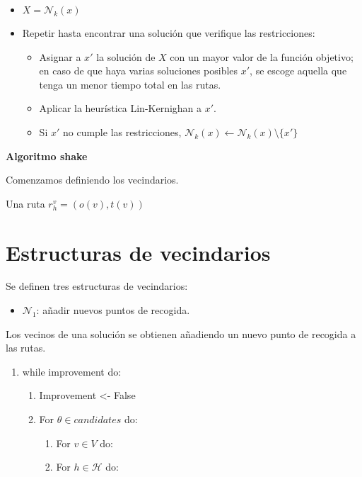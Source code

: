 \documentclass[
]{article}
\providecommand{\tightlist}{%
  \setlength{\itemsep}{0pt}\setlength{\parskip}{0pt}}
\begin{document}
\begin{itemize}
\tightlist
\item
  \(X = \mathcal{N}_k(x)\)
\item
  Repetir hasta encontrar una solución que verifique las restricciones:

  \begin{itemize}
  \tightlist
  \item
    Asignar a \(x'\) la solución de \(X\) con un mayor valor de la
    función objetivo; en caso de que haya varias soluciones posibles
    \(x'\), se escoge aquella que tenga un menor tiempo total en las
    rutas.
  \item
    Aplicar la heurística Lin-Kernighan a \(x'\).
  \item
    Si \(x'\) no cumple las restricciones,
    \(\mathcal{N}_k(x)\leftarrow \mathcal{N}_k(x) \setminus \{x'\}\)
  \end{itemize}
\end{itemize}

\textbf{Algoritmo shake}

Comenzamos definiendo los vecindarios.

Una ruta \(r_h^v = (o(v), t(v))\)

\hypertarget{estructuras-de-vecindarios}{%
\section{Estructuras de vecindarios}\label{estructuras-de-vecindarios}}

Se definen tres estructuras de vecindarios:

\begin{itemize}
\tightlist
\item
  \(\mathcal{N}_1\): añadir nuevos puntos de recogida.
\end{itemize}

Los vecinos de una solución se obtienen añadiendo un nuevo punto de
recogida a las rutas.

\begin{enumerate}
\def\labelenumi{\arabic{enumi}.}
\tightlist
\item
  while improvement do:

  \begin{enumerate}
  \def\labelenumii{\arabic{enumii}.}
  \tightlist
  \item
    Improvement \textless- False
  \item
    For \(\theta \in candidates\) do:

    \begin{enumerate}
    \def\labelenumiii{\arabic{enumiii}.}
    \tightlist
    \item
      For \(v\in V\) do:
    \item
      For \(h\in \mathcal{H}\) do:
    \end{enumerate}
  \end{enumerate}
\end{enumerate}
\end{document}

